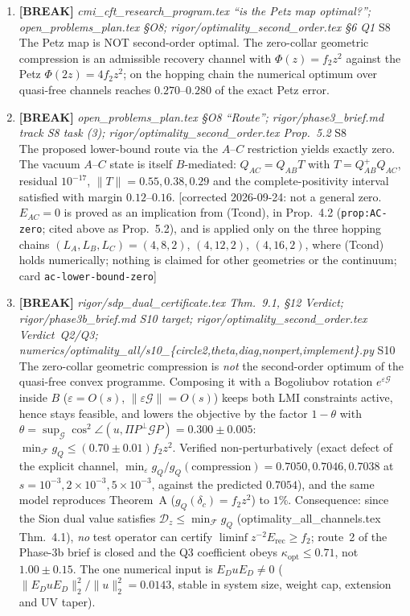 \documentclass[11pt]{article}
\begin{document}
\begin{enumerate}[leftmargin=1.6em,itemsep=6pt]
\item \textbf{[BREAK]} \emph{cmi\_cft\_research\_program.tex ``is the Petz map optimal?''; open\_problems\_plan.tex \S O8; rigor/optimality\_second\_order.tex \S6 Q1} \hfill\textsc{S8}\\ The Petz map is NOT second-order optimal. The zero-collar geometric compression is an admissible recovery channel with \(\Phi(z)=f_2z^2\) against the Petz \(\Phi(2z)=4f_2z^2\); on the hopping chain the numerical optimum over quasi-free channels reaches \(0.270\)--\(0.280\) of the exact Petz error.
\item \textbf{[BREAK]} \emph{open\_problems\_plan.tex \S O8 ``Route''; rigor/phase3\_brief.md track S8 task (3); rigor/optimality\_second\_order.tex Prop.~5.2} \hfill\textsc{S8}\\ The proposed lower-bound route via the \(A\)--\(C\) restriction yields exactly zero. The vacuum \(A\)--\(C\) state is itself \(B\)-mediated: \(Q_{AC}=Q_{AB}T\) with \(T=Q_{AB}^{+}Q_{AC}\), residual \(10^{-17}\), \(\lVert T\rVert=0.55,0.38,0.29\) and the complete-positivity interval satisfied with margin \(0.12\)--\(0.16\). [corrected 2026-09-24: not a general zero. \(E_{AC}=0\) is proved as an implication from (Tcond), in Prop.~4.2 (\texttt{prop:AC-zero}; cited above as Prop.~5.2), and is applied only on the three hopping chains \((L_A,L_B,L_C)=(4,8,2)\), \((4,12,2)\), \((4,16,2)\), where (Tcond) holds numerically; nothing is claimed for other geometries or the continuum; card \texttt{ac-lower-bound-zero}]
\item \textbf{[BREAK]} \emph{rigor/sdp\_dual\_certificate.tex Thm.~9.1, \S12 Verdict; rigor/phase3b\_brief.md S10 target; rigor/optimality\_second\_order.tex Verdict~Q2/Q3; numerics/optimality\_all/s10\_\{circle2,theta,diag,nonpert,implement\}.py} \hfill\textsc{S10}\\ The zero-collar geometric compression is \emph{not} the second-order optimum of the quasi-free convex programme. Composing it with a Bogoliubov rotation $e^{\varepsilon\mathcal G}$ inside $B$ ($\varepsilon=O(s)$, $\lVert\varepsilon\mathcal G\rVert=O(s)$) keeps both LMI constraints active, hence stays feasible, and lowers the objective by the factor $1-\theta$ with $\theta=\sup_{\mathcal G}\cos^2\angle(u,\Pi P^{\perp}\mathcal G P)=0.300\pm0.005$: $\min_{\mathcal F}g_Q\le(0.70\pm0.01)f_2z^2$. Verified non-perturbatively (exact defect of the explicit channel, $\min_\varepsilon g_Q/g_Q(\text{compression})=0.7050,0.7046,0.7038$ at $s=10^{-3},2\times10^{-3},5\times10^{-3}$, against the predicted $0.7054$), and the same model reproduces Theorem~A ($g_Q(\delta_c)=f_2z^2$) to $1\%$. Consequence: since the Sion dual value satisfies $\mathcal D_z\le\min_{\mathcal F}g_Q$ (optimality\_all\_channels.tex Thm.~4.1), \emph{no} test operator can certify $\liminf z^{-2}E_{\mathrm{rec}}\ge f_2$; route~2 of the Phase-3b brief is closed and the Q3 coefficient obeys $\kappa_{\mathrm{opt}}\le0.71$, not $1.00\pm0.15$. The one numerical input is $E_D u E_D\neq0$ ($\lVert E_DuE_D\rVert_2^2/\lVert u\rVert_2^2=0.0143$, stable in system size, weight cap, extension and UV taper).

\end{enumerate}
\end{document}
